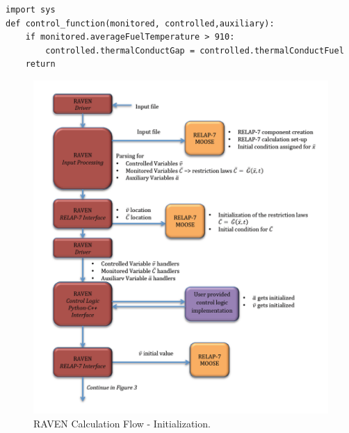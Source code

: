 \documentclass{mc2013}
\begin{document}
\lstset{
   language=Python,
   showstringspaces=false,
   formfeed=\newpage,
   tabsize=4,
   commentstyle=\itshape
}
\begin{lstlisting}
import sys
def control_function(monitored, controlled,auxiliary):
    if monitored.averageFuelTemperature > 910:
        controlled.thermalConductGap = controlled.thermalConductFuel
    return 
\end{lstlisting}
\begin{figure}
  \centering
     \includegraphics[width=1.0\textwidth]{figures/CalculationFlow_part_1.PNG}
  \caption{RAVEN Calculation Flow - Initialization.}
  \label{fig:CalcFlow1}
\end{figure}
\end{document}
